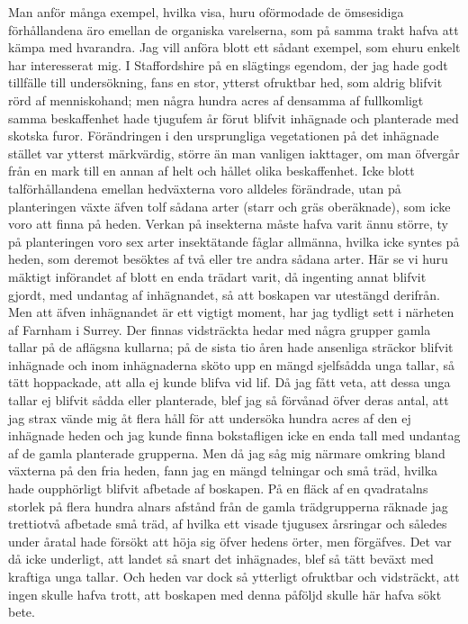 Man anför många exempel, hvilka visa, huru oförmodade de ömsesidiga förhållandena äro emellan de organiska varelserna, som på samma trakt hafva att kämpa med hvarandra. Jag vill anföra blott ett sådant exempel, som ehuru enkelt har interesserat mig. I Staffordshire på en slägtings egendom, der jag hade godt tillfälle till undersökning, fans en stor, ytterst ofruktbar hed, som aldrig blifvit rörd af menniskohand; men några hundra acres af densamma af fullkomligt samma beskaffenhet hade tjugufem år förut blifvit inhägnade och planterade med skotska furor. Förändringen i den ursprungliga vegetationen på det inhägnade stället var ytterst märkvärdig, större än man vanligen iakttager, om man öfvergår från en mark till en annan af helt och hållet olika beskaffenhet. Icke blott talförhållandena emellan hedväxterna voro alldeles förändrade, utan på planteringen växte äfven tolf sådana arter (starr och gräs oberäknade), som icke voro att finna på heden. Verkan på insekterna måste hafva varit ännu större, ty på planteringen voro sex arter insektätande fåglar allmänna, hvilka icke syntes på heden, som deremot besöktes af två eller tre andra sådana arter. Här se vi huru mäktigt införandet af blott en enda trädart varit, då ingenting annat blifvit gjordt, med undantag af inhägnandet, så att boskapen var utestängd derifrån. Men att äfven inhägnandet är ett vigtigt moment, har jag tydligt sett i närheten af Farnham i Surrey. Der finnas vidsträckta hedar med några grupper gamla tallar på de aflägsna kullarna; på de sista tio åren hade ansenliga sträckor blifvit inhägnade och inom inhägnaderna sköto upp en mängd sjelfsådda unga tallar, så tätt hoppackade, att alla ej kunde blifva vid lif. Då jag fått veta, att dessa unga tallar ej blifvit sådda eller planterade, blef jag så förvånad öfver deras antal, att jag strax vände mig åt flera håll för att undersöka hundra acres af den ej inhägnade heden och jag kunde finna bokstafligen icke en enda tall med undantag af de gamla planterade grupperna. Men då jag såg mig närmare omkring bland växterna på den fria heden, fann jag en mängd telningar och små träd, hvilka hade oupphörligt blifvit afbetade af boskapen. På en fläck af en qvadratalns storlek på flera hundra alnars afstånd från de gamla trädgrupperna räknade jag trettiotvå afbetade små träd, af hvilka ett visade tjugusex årsringar och således under åratal hade försökt att höja sig öfver hedens örter, men förgäfves. Det var då icke underligt, att landet så snart det inhägnades, blef så tätt beväxt med kraftiga unga tallar. Och heden var dock så ytterligt ofruktbar och vidsträckt, att ingen skulle hafva trott, att boskapen med denna påföljd skulle här hafva sökt bete.

